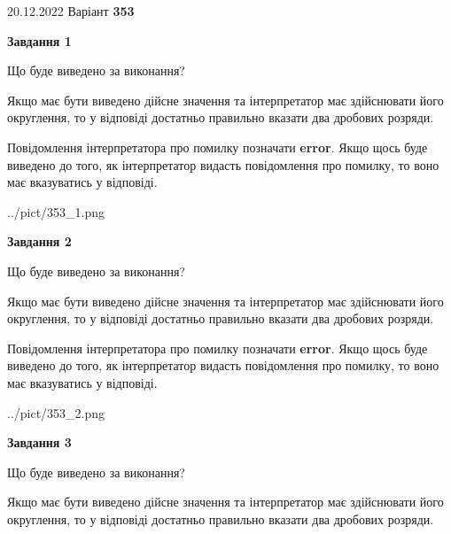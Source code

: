 \documentclass[12pt, ukrainian]{article}
\begin{document}
{20.12.2022 Варіант \No \textbf { 353 }\par}
{
\begin {Large}

{\begin {center}\textbf{Завдання 1}\end {center}}\par
Що буде виведено за виконання? \par

Якщо має бути виведено дійсне значення та інтерпретатор має здійснювати його округлення, 
то у відповіді достатньо правильно вказати два дробових розряди.

Повідомлення інтерпретатора про помилку позначати \textbf{error}.
Якщо щось буде виведено до того, як інтерпретатор видасть повідомлення про помилку, 
то воно має вказуватись у відповіді. \par

\begin{center}
	{../pict/353_1.png}
\end{center}
\newpage

{\begin {center}\textbf{Завдання 2}\end {center}}\par
Що буде виведено за виконання? \par

Якщо має бути виведено дійсне значення та інтерпретатор має здійснювати його округлення, 
то у відповіді достатньо правильно вказати два дробових розряди.

Повідомлення інтерпретатора про помилку позначати \textbf{error}.
Якщо щось буде виведено до того, як інтерпретатор видасть повідомлення про помилку, 
то воно має вказуватись у відповіді. \par

\begin{center}
	{../pict/353_2.png}
\end{center}
\newpage

{\begin {center}\textbf{Завдання 3}\end {center}}\par
Що буде виведено за виконання? \par

Якщо має бути виведено дійсне значення та інтерпретатор має здійснювати його округлення, 
то у відповіді достатньо правильно вказати два дробових розряди.


\end{Large}}
\end{document}
